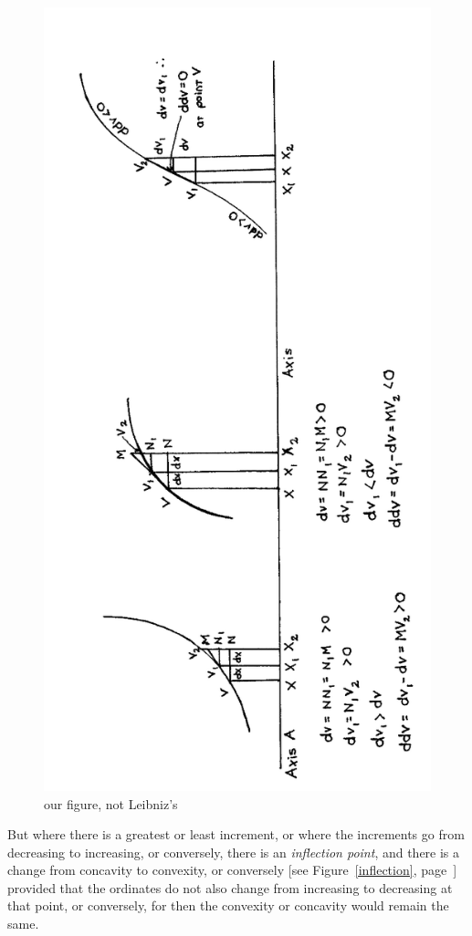 \documentclass[polutonikogreek,english,twoside,openright]{article}
\begin{document}
\begin{figure}[htp]
  \begin{center}
    \includegraphics[width=.73\textwidth]{fig/Figure8}
    \caption{our figure, not Leibniz's}
    \label{concavity}
  \end{center}
\end{figure} But where there is a greatest or least increment, or
where the increments go from decreasing to increasing, or conversely,
there is an {\em inflection point}, and there is a change from
concavity to convexity, or conversely [see Figure~\ref{inflection},
page~\pageref{inflection}] provided that the ordinates do not also
change from increasing to decreasing at that point, or conversely, for
then the convexity or concavity would remain the same.
\end{document}
